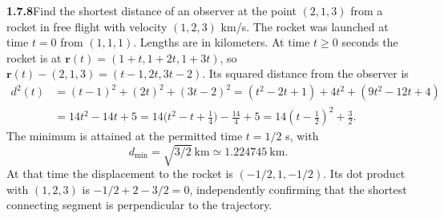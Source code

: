 \par\bigskip
\noindent\textbf{1.7.8}\quad Find the shortest distance of an observer at the
point $(2,1,3)$ from a rocket in free flight with velocity $(1,2,3)$ km/s.
The rocket was launched at time $t=0$ from $(1,1,1)$. Lengths are in
kilometers.
\solution
At time $t\ge0$ seconds the rocket is at
$\mathbf r(t)=(1+t,1+2t,1+3t)$, so
$\mathbf r(t)-(2,1,3)=(t-1,2t,3t-2)$. Its squared distance from the
observer is
\[
 \begin{aligned}
 d^2(t)&=(t-1)^2+(2t)^2+(3t-2)^2
       =(t^2-2t+1)+4t^2+(9t^2-12t+4)\\
       &=14t^2-14t+5=14\bigl(t^2-t+\tfrac14\bigr)-\tfrac{14}4+5
       =14(t-\tfrac12)^2+\frac32.
 \end{aligned}
\]
The minimum is attained at the permitted time $t=1/2$ s, with
\[
 \boxed{d_{\min}=\sqrt{3/2}\ \mathrm{km}\simeq1.224745\ \mathrm{km}}.
\]
At that time the displacement to the rocket is $(-1/2,1,-1/2)$.
Its dot product with $(1,2,3)$ is $-1/2+2-3/2=0$, independently
confirming that the shortest connecting segment is perpendicular to
the trajectory.


